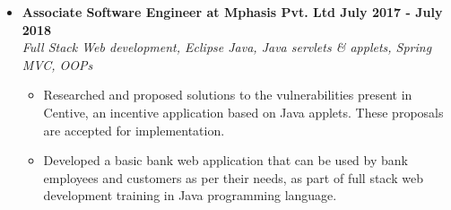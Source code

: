 \documentclass[a4paper,11pt]{article}
\newcommand{\isep}{-2 pt}
\newcommand{\spsep}{-0.75cm}
\begin{document}
\begin{itemize}
	\item \textbf{Associate Software Engineer at Mphasis Pvt. Ltd \hfill July 2017 - July 2018} \\
	\emph{Full Stack Web development, Eclipse \hfill Java, Java servlets \& applets, Spring MVC, OOPs} \\[\spsep]
		\begin{itemize} \itemsep \isep
		\item Researched and proposed solutions to the vulnerabilities present in Centive, an incentive application based on Java applets. These proposals are accepted for implementation. %
		\item Developed a basic bank web application that can be used by bank employees and customers as per their needs, as part of full stack web development training in Java programming language.
		\end{itemize}
\end{itemize}
\end{document}
